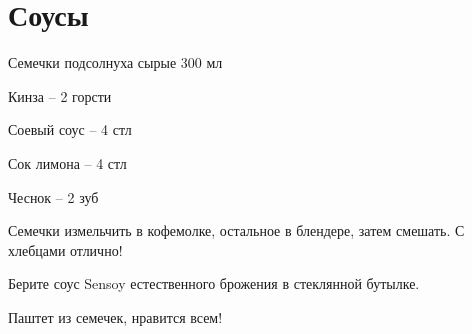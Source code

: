 \chapter*{Соусы}
\label{sec:sauces}


{
\item Семечки подсолнуха сырые 300 мл
\item Кинза – 2 горсти
\item Соевый соус – 4 стл
\item Сок лимона – 4 стл
}{
\item Чеснок – 2 зуб
}{
Семечки измельчить в кофемолке, остальное в блендере, затем смешать. С хлебцами отлично!
}{
\begin{advice}
\item Берите соус Sensoy естественного брожения в стеклянной бутылке.
\item Паштет из семечек, нравится всем!
\end{advice}}{}



\recipe{}{}{}
{
\item 
}{
\item 
}{
}{}{}



\recipe{}{}{}
{
\item 
}{
\item 
}{
}{}{}



\recipe{}{}{}
{
\item 
}{
\item 
}{
}{}{}



\recipe{}{}{}
{
\item 
}{
\item 
}{
}{}{}




